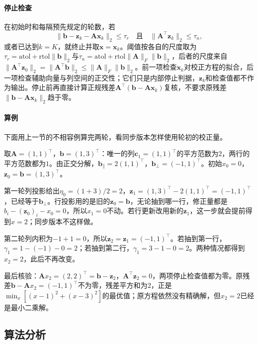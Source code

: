 \paragraph{停止检查}
在初始时和每隔预先规定的轮数，若
\[
\lVert\bm b-\bm z_k-\bm A\bm x_k\rVert_2\leq\tau_r
\quad\text{且}\quad
\lVert\bm A^\top\bm z_k\rVert_2\leq\tau_n ,
\]
或者已达到$k=K$，就终止并取$\bm x=\bm x_k$。阈值按各自的尺度取为$\tau_r=\mathrm{atol}+\mathrm{rtol}\lVert\bm b\rVert_2$与$\tau_n=\mathrm{atol}+\mathrm{rtol}\lVert\bm A\rVert_F\lVert\bm b\rVert_2$，后者的尺度来自$\lVert\bm A^\top\bm z_0\rVert_2=\lVert\bm A^\top\bm b\rVert_2\leq\lVert\bm A\rVert_F\lVert\bm b\rVert_2$。前一项检查$\bm x_k$对校正方程的拟合，后一项检查辅助向量与列空间的正交性；它们只是内部停止判据，$\bm z_k$和检查值都不作为输出。停止前再直接计算正规残差$\bm A^\top(\bm b-\bm A\bm x_k)$复核，不要求原残差$\lVert\bm b-\bm A\bm x_k\rVert_2$趋于零。

\paragraph{算例}
下面用上一节的不相容例算完两轮，看同步版本怎样使用轮初的校正量。

\begin{example}[扩展Kaczmarz算法的前两轮]
\label{ex:ls-extended-kaczmarz-two-rounds}
取$\bm A=(1,1)^\top$，$\bm b=(1,3)^\top$：唯一的列$\bm c_1=(1,1)^\top$的平方范数为$2$，两行的平方范数都为$1$。由正交分解，$\bm b_\parallel=2(1,1)^\top$，$\bm b_\perp=(-1,1)^\top$。初始$x_0=0$，$\bm z_0=\bm b=(1,3)^\top$。

第一轮列投影给出$\eta_0=(1+3)/2=2$，$\bm z_1=(1,3)^\top-2(1,1)^\top=(-1,1)^\top$，已经等于$\bm b_\perp$。行投影用的是旧的$\bm z_0=\bm b$，无论抽到哪一行，修正量都是$b_i-(\bm z_0)_i-x_0=0$，所以$x_1=0$不动。若行更新改用新的$\bm z_1$，这一步就会提前得到$x=2$；同步版本不这样做。

第二轮列内积为$-1+1=0$，所以$\bm z_2=\bm z_1=(-1,1)^\top$。若抽到第一行，$\gamma_1=1-(-1)-0=2$；若抽到第二行，$\gamma_1=3-1-0=2$。两种情况都得到$x_2=2$，此后不再改变。

最后核验：$\bm A x_2=(2,2)^\top=\bm b-\bm z_2$，$\bm A^\top\bm z_2=0$，两项停止检查值都为零。原残差$\bm b-\bm A x_2=(-1,1)^\top$不为零，残差平方和为$2$，正是$\min_x[(x-1)^2+(x-3)^2]$的最优值；原方程依然没有精确解，但$x_2=2$已经是最小二乘解。
\end{example}

\subsection{算法分析}

